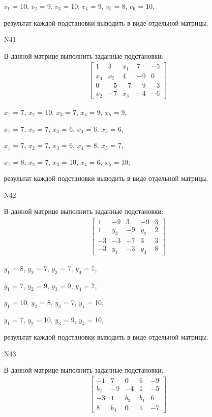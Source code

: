 \documentclass[11pt]{report}
\begin{document}
$v_{1}$ = 10, $v_{2}$ = 9, $v_{3}$ = 10, $v_{4}$ = 9, $v_{5}$ = 8, $v_{6}$ = 10, 

результат каждой подстановки выводить в виде отдельной матрицы.

N41

В данной матрице выполнить заданные подстановки:
\begin{align*}
\left[\begin{matrix}1 & 3 & x_{1} & 7 & -5\\x_{4} & x_{5} & 4 & -9 & 0\\0 & -5 & -7 & -9 & -3\\x_{2} & -7 & x_{3} & -4 & -6\end{matrix}\right]
\end{align*}


$x_{1}$ = 7, $x_{2}$ = 10, $x_{3}$ = 7, $x_{4}$ = 9, $x_{5}$ = 9, 

$x_{1}$ = 7, $x_{2}$ = 7, $x_{3}$ = 6, $x_{4}$ = 6, $x_{5}$ = 6, 

$x_{1}$ = 7, $x_{2}$ = 7, $x_{3}$ = 6, $x_{4}$ = 8, $x_{5}$ = 7, 

$x_{1}$ = 8, $x_{2}$ = 7, $x_{3}$ = 10, $x_{4}$ = 6, $x_{5}$ = 10, 

результат каждой подстановки выводить в виде отдельной матрицы.

N42

В данной матрице выполнить заданные подстановки:
\begin{align*}
\left[\begin{matrix}1 & -9 & 3 & -9 & 3\\1 & y_{3} & -9 & y_{2} & 2\\-3 & -3 & -7 & 3 & 3\\-3 & y_{1} & -3 & y_{4} & 8\end{matrix}\right]
\end{align*}


$y_{1}$ = 8, $y_{2}$ = 7, $y_{3}$ = 7, $y_{4}$ = 7, 

$y_{1}$ = 7, $y_{2}$ = 9, $y_{3}$ = 9, $y_{4}$ = 7, 

$y_{1}$ = 10, $y_{2}$ = 8, $y_{3}$ = 7, $y_{4}$ = 10, 

$y_{1}$ = 7, $y_{2}$ = 10, $y_{3}$ = 9, $y_{4}$ = 10, 

результат каждой подстановки выводить в виде отдельной матрицы.

N43

В данной матрице выполнить заданные подстановки:
\begin{align*}
\left[\begin{matrix}-1 & 7 & 0 & 6 & -9\\b_{2} & -9 & -4 & 1 & -5\\-3 & 1 & b_{3} & b_{1} & 6\\8 & b_{4} & 0 & 1 & -7\end{matrix}\right]
\end{align*}
\end{document}
